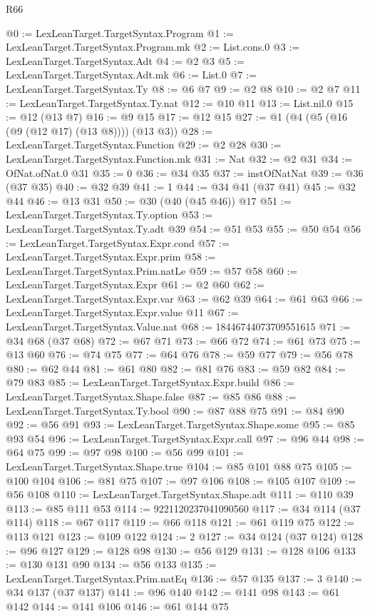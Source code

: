 \begin{lexlean}{R66}
\begin{coremodule}
@0 := LexLeanTarget.TargetSyntax.Program
@1 := LexLeanTarget.TargetSyntax.Program.mk
@2 := List.cons.{0}
@3 := LexLeanTarget.TargetSyntax.Adt
@4 := @2 @3
@5 := LexLeanTarget.TargetSyntax.Adt.mk
@6 := List.{0}
@7 := LexLeanTarget.TargetSyntax.Ty
@8 := @6 @7
@9 := @2 @8
@10 := @2 @7
@11 := LexLeanTarget.TargetSyntax.Ty.nat
@12 := @10 @11
@13 := List.nil.{0}
@15 := @12 (@13 @7)
@16 := @9 @15
@17 := @12 @15
@27 := @1 (@4 (@5 (@16 (@9 (@12 @17) (@13 @8)))) (@13 @3))
@28 := LexLeanTarget.TargetSyntax.Function
@29 := @2 @28
@30 := LexLeanTarget.TargetSyntax.Function.mk
@31 := Nat
@32 := @2 @31
@34 := OfNat.ofNat.{0} @31
@35 := 0
@36 := @34 @35
@37 := instOfNatNat
@39 := @36 (@37 @35)
@40 := @32 @39
@41 := 1
@44 := @34 @41 (@37 @41)
@45 := @32 @44
@46 := @13 @31
@50 := @30 (@40 (@45 @46)) @17
@51 := LexLeanTarget.TargetSyntax.Ty.option
@53 := LexLeanTarget.TargetSyntax.Ty.adt @39
@54 := @51 @53
@55 := @50 @54
@56 := LexLeanTarget.TargetSyntax.Expr.cond
@57 := LexLeanTarget.TargetSyntax.Expr.prim
@58 := LexLeanTarget.TargetSyntax.Prim.natLe
@59 := @57 @58
@60 := LexLeanTarget.TargetSyntax.Expr
@61 := @2 @60
@62 := LexLeanTarget.TargetSyntax.Expr.var
@63 := @62 @39
@64 := @61 @63
@66 := LexLeanTarget.TargetSyntax.Expr.value @11
@67 := LexLeanTarget.TargetSyntax.Value.nat
@68 := 18446744073709551615
@71 := @34 @68 (@37 @68)
@72 := @67 @71
@73 := @66 @72
@74 := @61 @73
@75 := @13 @60
@76 := @74 @75
@77 := @64 @76
@78 := @59 @77
@79 := @56 @78
@80 := @62 @44
@81 := @61 @80
@82 := @81 @76
@83 := @59 @82
@84 := @79 @83
@85 := LexLeanTarget.TargetSyntax.Expr.build
@86 := LexLeanTarget.TargetSyntax.Shape.false
@87 := @85 @86
@88 := LexLeanTarget.TargetSyntax.Ty.bool
@90 := @87 @88 @75
@91 := @84 @90
@92 := @56 @91
@93 := LexLeanTarget.TargetSyntax.Shape.some
@95 := @85 @93 @54
@96 := LexLeanTarget.TargetSyntax.Expr.call
@97 := @96 @44
@98 := @64 @75
@99 := @97 @98
@100 := @56 @99
@101 := LexLeanTarget.TargetSyntax.Shape.true
@104 := @85 @101 @88 @75
@105 := @100 @104
@106 := @81 @75
@107 := @97 @106
@108 := @105 @107
@109 := @56 @108
@110 := LexLeanTarget.TargetSyntax.Shape.adt
@111 := @110 @39
@113 := @85 @111 @53
@114 := 9221120237041090560
@117 := @34 @114 (@37 @114)
@118 := @67 @117
@119 := @66 @118
@121 := @61 @119 @75
@122 := @113 @121
@123 := @109 @122
@124 := 2
@127 := @34 @124 (@37 @124)
@128 := @96 @127
@129 := @128 @98
@130 := @56 @129
@131 := @128 @106
@133 := @130 @131 @90
@134 := @56 @133
@135 := LexLeanTarget.TargetSyntax.Prim.natEq
@136 := @57 @135
@137 := 3
@140 := @34 @137 (@37 @137)
@141 := @96 @140
@142 := @141 @98
@143 := @61 @142
@144 := @141 @106
@146 := @61 @144 @75

\end{coremodule}
\end{lexlean}
